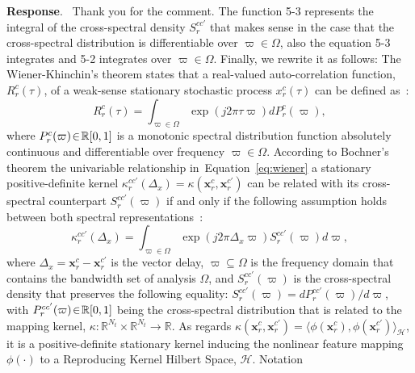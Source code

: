 \documentclass[runningheads]{llncs}
\newcommand{\en}{\negthinspace\in\negthinspace }
\newcommand{\Real}{\mathbb{R}}
\newcommand{\ve}[1]{\bm {#1}}
\newenvironment{reviewer}{\setcounter{pointcounter}{1}}{}
\newcommand{\changes}[1]{\textcolor[rgb]{1.00,0.00,0.00}{#1}}
\newcommand{\reply}{\medskip \noindent \textbf{Response}.\ }
\begin{document}
\begin{reviewer}
  \reply{
    Thank you for the comment. The function 5-3 represents the
    integral of the cross-spectral density $S^{cc'}_{r}$ that makes
    sense in the case that the cross-spectral distribution is
    differentiable over $\varpi \in \Omega$, also the equation 5-3
    integrates and 5-2 integrates over $\varpi \in \Omega$. Finally,
    we rewrite it as follows:
    \changes{The Wiener-Khinchin's theorem states that a real-valued
      auto-correlation function, $R^{c}_{r}(\tau)$, of a weak-sense
      stationary stochastic process $x^{c}_{r}(\tau)$ can be defined
      as~\cite{cohen1998generalization}:
      \begin{equation}\label{eq:wiener}
        R^{c}_{r}(\tau) = \int_{\varpi \in \Omega}\exp({j2\pi \tau
        \varpi})dP^{c}_{r}(\varpi) ,
      \end{equation}
      where $P^{c}_{r}(\varpi)\en\Real[0,1]$ is a monotonic spectral
      distribution function absolutely continuous and differentiable
      over frequency $\varpi \in \Omega$.
      According to Bochner's theorem the univariable relationship
      in~Equation~\eqref{eq:wiener} a stationary positive-definite
      kernel \changes{$\kappa^{cc'}_{r}(\Delta_{x}) =
      \kappa(\ve{x}^{c}_{r},\ve{x}^{c'}_{r})$} can be related with
      its cross-spectral counterpart $S^{cc'}_{r}(\varpi)$ if and
      only if the following assumption holds between both spectral
      representations~\cite{bochner2020harmonic}:
      \begin{equation}\label{eq:kCSD}
        \kappa^{cc'}_{r}(\Delta_{x}) = \int_{\varpi \in \Omega}
        \exp{(j2\pi {\Delta_{x}} \varpi)} S^{cc'}_{r}(\varpi)d\varpi,
      \end{equation}
      where $\Delta_{x} = \ve{x}^{c}_{r} - \ve{x}^{c'}_{r}$ is the
      vector delay, $\varpi\subseteq\varOmega$ is the frequency
      domain that contains the bandwidth set of analysis $\varOmega$,
      and $ S^{cc'}_{r}(\varpi)$ is the cross-spectral density that
      preserves the following equality: $ S^{cc'}_{r}(\varpi) = d
      {P}^{cc'}_{r}(\varpi)/d\varpi$, with $
      P^{cc'}_{r}(\varpi)\en\Real[0,1]$ being the cross-spectral
      distribution that is related to the mapping kernel, $\kappa:
      \Real^{N_t} \times \Real^{N_t}\to \Real$.
      As regards $\kappa(\ve{x}^{c}_{r},\ve{x}^{c'}_{r}) = \langle
      \phi(\ve{x}^{c}_{r}),\phi(\ve{x}^{c'}_{r})
      \rangle_{\mathcal{H}}$, it is a positive-definite stationary
      kernel inducing the nonlinear feature mapping $\phi(\cdot)$ to
      a Reproducing Kernel Hilbert Space, $\mathcal{H}$. Notation
}}
\end{reviewer}
\end{document}
